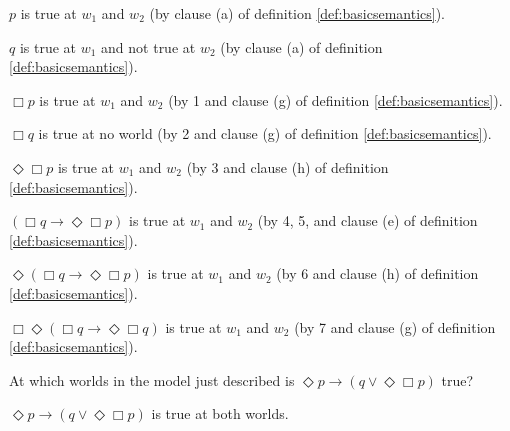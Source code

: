 \begin{enumerate*}
  \item $p$ is true at $w_{1}$ and $w_{2}$ (by clause (a) of definition
  \ref{def:basicsemantics}).
  \item $q$ is true at $w_{1}$ and not true at $w_{2}$ (by clause (a) of definition
  \ref{def:basicsemantics}).
  \item $\Box p$ is true at $w_{1}$ and $w_{2}$ (by 1 and clause (g) of definition
  \ref{def:basicsemantics}).
  \item $\Box q$ is true at no world (by 2 and clause (g) of definition
  \ref{def:basicsemantics}).
  \item $\Diamond\Box p$ is true at $w_{1}$ and $w_{2}$ (by 3 and clause (h) of
  definition \ref{def:basicsemantics}).
  \item $(\Box q \to \Diamond\Box p)$ is true at $w_{1}$ and $w_{2}$ (by 4, 5,
  and clause (e) of definition \ref{def:basicsemantics}).
  \item $\Diamond(\Box q \to \Diamond\Box p)$ is true at $w_{1}$ and $w_{2}$ (by
  6 and clause (h) of definition \ref{def:basicsemantics}).
  \item $\Box\Diamond(\Box q \to \Diamond\Box q)$ is true at $w_{1}$ and $w_{2}$ (by 7
  and clause (g) of definition \ref{def:basicsemantics}).
\end{enumerate*}

\begin{exercise}
  At which worlds in the model just described is
  $\Diamond p \to (q \lor \Diamond\Box p)$ true?
\end{exercise}
\begin{solution}
  $\Diamond p \to (q \lor \Diamond\Box p)$ is true at both worlds.
\end{solution}



